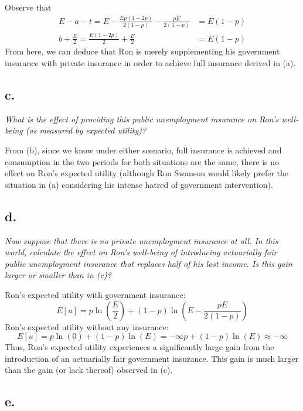 \documentclass[
]{article}
\begin{document}
Observe that\\
\[\begin{aligned}
E - a - t = E - \frac{Ep(1-2p)}{2(1-p)} -\frac{pE}{2(1-p)} &= E(1-p) \\
 b +  \frac{E}{2} = \frac{E(1-2p)}{2} + \frac{E}{2} &= E(1-p)
\end{aligned} \] From here, we can deduce that Ron is merely
supplementing his government insurance with private insurance in order
to achieve full insurance derived in (a).

\hypertarget{c.-2}{%
\subsection{c.~}\label{c.-2}}

\textit{What is the effect of providing this public unemployment insurance on Ron’s well-being (as measured by expected utility)?}

From (b), since we know under either scenario, full insurance is
achieved and consumption in the two periods for both situations are the
same, there is no effect on Ron's expected utility (although Ron Swanson
would likely prefer the situation in (a) considering his intense hatred
of government intervention).

\hypertarget{d.-1}{%
\subsection{d.~}\label{d.-1}}

\textit{Now suppose that there is no private unemployment insurance at all. In this world, calculate the effect on Ron’s well-being of introducing actuarially fair public unemployment insurance that replaces half of his lost income. Is this gain larger or smaller than in (c)?}

Ron's expected utility with government insurance:
\[E[u] = p\ln(\frac{E}{2}) + (1-p)\ln(E-\frac{pE}{2(1-p)})\] Ron's
expected utility without any insurance:\\
\[E[u] = p\ln(0) + (1-p)\ln(E) = -\infty p + (1-p)\ln(E) \approx -\infty\]
Thus, Ron's expected utility experiences a significantly large gain from
the introduction of an actuarially fair government insurance. This gain
is much larger than the gain (or lack thereof) observed in (c).

\hypertarget{e.}{%
\subsection{e.}\label{e.}}
\end{document}
